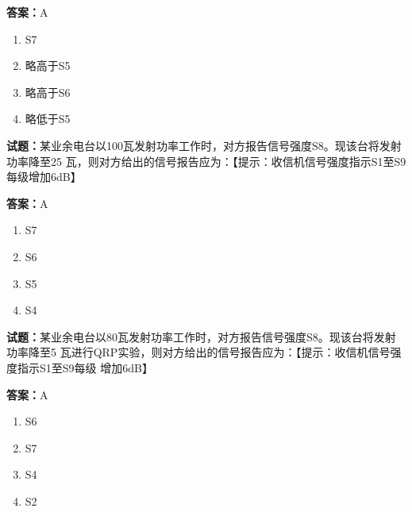 \documentclass{ctexbook}
\begin{document}
\textbf{答案：}A 

\begin{enumerate}[leftmargin=3em]
  \item S7 

  \item 略高于S5 

  \item 略高于S6 

  \item 略低于S5 

\end{enumerate}





\vspace{1em}

\textbf{试题：}某业余电台以100瓦发射功率工作时，对方报告信号强度S8。现该台将发射功率降至25
瓦，则对方给出的信号报告应为：【提示：收信机信号强度指示S1至S9每级增加6dB】 


\textbf{答案：}A 

\begin{enumerate}[leftmargin=3em]
  \item S7 

  \item S6 

  \item S5 

  \item S4 

\end{enumerate}





\vspace{1em}

\textbf{试题：}某业余电台以80瓦发射功率工作时，对方报告信号强度S8。现该台将发射功率降至5
瓦进行QRP实验，则对方给出的信号报告应为：【提示：收信机信号强度指示S1至S9每级
增加6dB】 

\textbf{答案：}A 

\begin{enumerate}[leftmargin=3em]
  \item S6 

  \item S7 

  \item S4 

  \item S2 

\end{enumerate}
\end{document}
